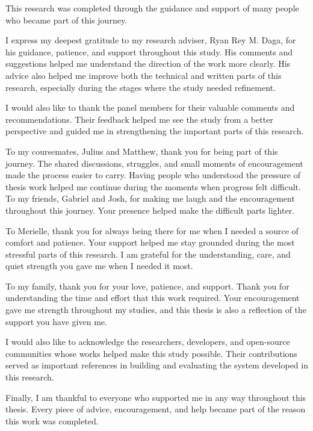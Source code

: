 
This research was completed through the guidance and support of many people who became part of this journey.

I express my deepest gratitude to my research adviser, Ryan Rey M. Daga, for his guidance, patience, and support throughout this study. His comments and suggestions helped me understand the direction of the work more clearly. His advice also helped me improve both the technical and written parts of this research, especially during the stages where the study needed refinement.

I would also like to thank the panel members for their valuable comments and recommendations. Their feedback helped me see the study from a better perspective and guided me in strengthening the important parts of this research.

To my coursemates, Julius and Matthew, thank you for being part of this journey. The shared discussions, struggles, and small moments of encouragement made the process easier to carry. Having people who understood the pressure of thesis work helped me continue during the moments when progress felt difficult. To my friends, Gabriel and Josh, for making me laugh and the encouragement throughout this journey. Your presence helped make the difficult parts lighter. 

To Merielle, thank you for always being there for me when I needed a source of comfort and patience. Your support helped me stay grounded during the most stressful parts of this research. I am grateful for the understanding, care, and quiet strength you gave me when I needed it most.

To my family, thank you for your love, patience, and support. Thank you for understanding the time and effort that this work required. Your encouragement gave me strength throughout my studies, and this thesis is also a reflection of the support you have given me.

I would also like to acknowledge the researchers, developers, and open-source communities whose works helped make this study possible. Their contributions served as important references in building and evaluating the system developed in this research.

Finally, I am thankful to everyone who supported me in any way throughout this thesis. Every piece of advice, encouragement, and help became part of the reason this work was completed.
